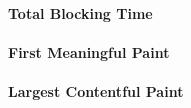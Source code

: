 \paragraph{Total Blocking Time}









\paragraph{First Meaningful Paint}


















\paragraph{Largest Contentful Paint}












